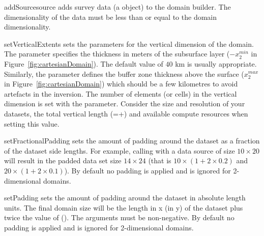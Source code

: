 \begin{methoddesc}[DomainBuilder]{addSource}{source}
adds survey data  (a  object) to the domain
builder. The dimensionality of the data must be less than or equal to the
domain dimensionality.
\end{methoddesc}

\begin{methoddesc}[DomainBuilder]{setVerticalExtents}{%
%
%
}
sets the parameters for the vertical dimension of the domain. The parameter
 specifies the thickness in meters of the subsurface layer
($-x_2^{min}$ in Figure~\ref{fig:cartesianDomain}).
The default value of $40$ km is usually appropriate. Similarly, the
 parameter defines the buffer zone thickness above the surface
($x_2^{max}$ in Figure~\ref{fig:cartesianDomain}) which should be a few
kilometres to avoid artefacts in the inversion.
The number of elements (or cells) in the vertical dimension is set with the
 parameter. Consider the size and resolution of your datasets,
the total vertical length (=+) and available
compute resources when setting this value.
\end{methoddesc}

\begin{methoddesc}[DomainBuilder]{setFractionalPadding}{%
%
}
sets the amount of padding around the dataset as a fraction of the dataset side
lengths.  
For example, calling  with a data source
of size $10 \times 20$ will result in the padded data set size $14 \times 24$
(that is $10 \times (1+2 \times 0.2)$ and $20 \times (1+2 \times 0.1)$).
By default no padding is applied and  is ignored for 2-dimensional
domains.
\end{methoddesc}

\begin{methoddesc}[DomainBuilder]{setPadding}{%
%
}
sets the amount of padding around the dataset in absolute length units.
The final domain size will be the length in x (in y) of the dataset plus twice
the value of  (). The arguments must be non-negative.
By default no padding is applied and  is ignored for 2-dimensional
domains.
\end{methoddesc}

